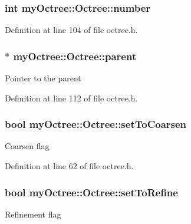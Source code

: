 \subsubsection[{number}]{\setlength{\rightskip}{0pt plus 5cm}int my\+Octree\+::\+Octree\+::number}\label{classmy_octree_1_1_octree_a86d3fb8b805509bc5522b8b470d2c682}


Definition at line 104 of file octree.\+h.

\hypertarget{classmy_octree_1_1_octree_a3a3b56d332ffeb81743005d11d3a7942}{}
\subsubsection[{parent}]{$\ast$ my\+Octree\+::\+Octree\+::parent\hspace{0.3cm}{\ttfamily [private]}}\label{classmy_octree_1_1_octree_a3a3b56d332ffeb81743005d11d3a7942}
Pointer to the parent 

Definition at line 112 of file octree.\+h.

\hypertarget{classmy_octree_1_1_octree_a4fb4740c2e6cee437bd9e6c2268a0fd2}{}
\subsubsection[{set\+To\+Coarsen}]{\setlength{\rightskip}{0pt plus 5cm}bool my\+Octree\+::\+Octree\+::set\+To\+Coarsen}\label{classmy_octree_1_1_octree_a4fb4740c2e6cee437bd9e6c2268a0fd2}
Coarsen flag 

Definition at line 62 of file octree.\+h.

\hypertarget{classmy_octree_1_1_octree_aad874752825bfcf0631d51abddcd6f8d}{}
\subsubsection[{set\+To\+Refine}]{\setlength{\rightskip}{0pt plus 5cm}bool my\+Octree\+::\+Octree\+::set\+To\+Refine}\label{classmy_octree_1_1_octree_aad874752825bfcf0631d51abddcd6f8d}
Refinement flag 

